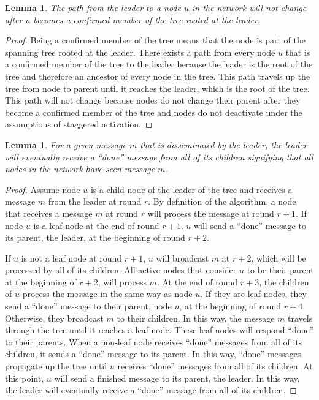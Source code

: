 \documentclass[english]{article}
\newtheorem{lemma}[theorem]{Lemma}
\begin{document}
\begin{lemma}
\label{StaggeredStablePath}
The path from the leader to a node $u$ in the network will not change after $u$ becomes a confirmed member of the tree rooted at the leader.
\end{lemma}
\begin{proof}
Being a confirmed member of the tree means that the node is part of the spanning tree rooted at the leader. There exists a path from every node $u$ that is a confirmed member of the tree to the leader because the leader is the root of the tree and therefore an ancestor of every node in the tree. This path travels up the tree from node to parent until it reaches the leader, which is the root of the tree. This path will not change because nodes do not change their parent after they become a confirmed member of the tree and nodes do not deactivate under the assumptions of staggered activation.
\end{proof}

\begin{lemma}
\label{StaggeredSpanningTreePropagation}
For a given message $m$ that is disseminated by the leader, the leader will eventually receive a ``done'' message from all of its children signifying that all nodes in the network have seen message $m$.
\end{lemma}
\begin{proof}

Assume node $u$ is a child node of the leader of the tree and receives a message $m$ from the leader at round $r$. By definition of the algorithm, a node that receives a message $m$ at round $r$ will process the message at round $r+1$. If node $u$ is a leaf node at the end of round $r+1$, $u$ will send a ``done'' message to its parent, the leader, at the beginning of round $r+2$.

If $u$ is not a leaf node at round $r+1$, $u$ will broadcast $m$ at $r+2$, which will be processed by all of its children. All active nodes that consider $u$ to be their parent at the beginning of $r+2$, will process $m$. At the end of round $r+3$, the children of $u$ process the message in the same way as node $u$. If they are leaf nodes, they send a ``done'' message to their parent, node $u$, at the beginning of round $r+4$. Otherwise, they broadcast $m$ to their children. In this way, the message $m$ travels through the tree until it reaches a leaf node. These leaf nodes will respond ``done'' to their parents. When a non-leaf node receives ``done'' messages from all of its children, it sends a ``done'' message to its parent. In this way, ``done'' messages propagate up the tree until $u$ receives ``done'' messages from all of its children. At this point, $u$ will send a finished message to its parent, the leader. In this way, the leader will eventually receive a ``done'' message from all of its children.

\end{proof}
\end{document}
